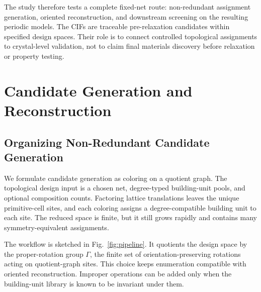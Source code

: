 \documentclass[pdflatex,sn-mathphys-num]{sn-jnl}
\theoremstyle{thmstyleone}%
\begin{document}
The study therefore tests a complete fixed-net route: non-redundant assignment generation, oriented reconstruction, and downstream screening on the resulting periodic models. The CIFs are traceable pre-relaxation candidates within specified design spaces. Their role is to connect controlled topological assignments to crystal-level validation, not to claim final materials discovery before relaxation or property testing.

\section*{Candidate Generation and Reconstruction}

\subsection*{Organizing Non-Redundant Candidate Generation}
\label{sec:theory}
We formulate candidate generation as coloring on a quotient graph. The topological design input is a chosen net, degree-typed building-unit pools, and optional composition counts. Factoring lattice translations leaves the unique primitive-cell sites, and each coloring assigns a degree-compatible building unit to each site. The reduced space is finite, but it still grows rapidly and contains many symmetry-equivalent assignments.

The workflow is sketched in Fig.~\ref{fig:pipeline}. It quotients the design space by the proper-rotation group $\Gamma$, the finite set of orientation-preserving rotations acting on quotient-graph sites. This choice keeps enumeration compatible with oriented reconstruction. Improper operations can be added only when the building-unit library is known to be invariant under them.
\end{document}
